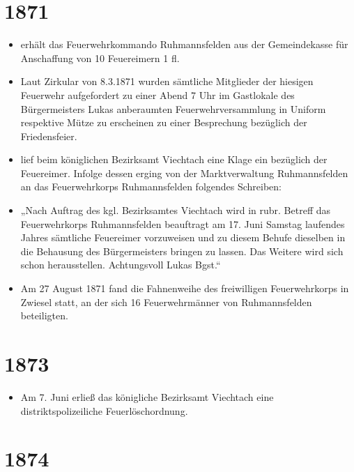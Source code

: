 \documentclass[12pt,a4paper]{book}
\begin{document}
\section*{1871}

\begin{itemize}
\item erhält das Feuerwehrkommando Ruhmannsfelden aus der Gemeindekasse
für Anschaffung von 10 Feuereimern 1 fl.

\item Laut Zirkular von 8.3.1871 wurden sämtliche Mitglieder der
hiesigen Feuerwehr aufgefordert zu einer Abend 7 Uhr im Gastlokale des
Bürgermeisters Lukas anberaumten Feuerwehrversammlung in Uniform
respektive Mütze zu erscheinen zu einer Besprechung bezüglich der
Friedensfeier.

\item lief beim königlichen Bezirksamt Viechtach eine Klage ein
bezüglich der Feuereimer. Infolge dessen erging von der Marktverwaltung
Ruhmannsfelden an das Feuerwehrkorps Ruhmannsfelden folgendes Schreiben:

\item „Nach Auftrag des kgl. Bezirksamtes Viechtach wird in rubr.
Betreff das Feuerwehrkorps Ruhmannsfelden beauftragt am 17. Juni Samstag
laufendes Jahres sämtliche Feuereimer vorzuweisen und zu diesem Behufe
dieselben in die Behausung des Bürgermeisters bringen zu lassen. Das
Weitere wird sich schon herausstellen. Achtungsvoll Lukas Bgst.“

\item Am 27 August 1871 fand die Fahnenweihe des freiwilligen
Feuerwehrkorps in Zwiesel statt, an der sich 16 Feuerwehrmänner von
Ruhmannsfelden beteiligten.
\end{itemize}

\section*{1873}

\begin{itemize}
\item Am 7. Juni erließ das königliche Bezirksamt Viechtach eine
distriktspolizeiliche Feuerlöschordnung.
\end{itemize}

\section*{1874}
\end{document}
